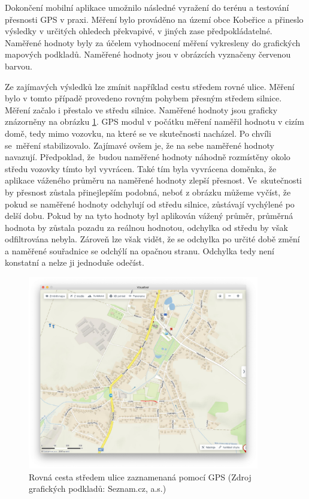 \documentclass[czech, bachelor]{diploma}
\begin{document}
Dokončení mobilní aplikace umožnilo následné vyražení do terénu a testování přesnosti GPS v praxi. Měření bylo prováděno na území
obce Kobeřice a přineslo výsledky v určitých ohledech překvapivé, v jiných zase předpokládatelné. Naměřené hodnoty byly za účelem
vyhodnocení měření vykresleny do grafických mapových podkladů. Naměřené hodnoty jsou v obrázcích vyznačeny červenou barvou.

Ze zajímavých výsledků lze zmínit například cestu středem rovné ulice. Měření bylo v tomto případě provedeno rovným pohybem
přesným středem silnice. Měření začalo i přestalo ve středu silnice. Naměřené hodnoty jsou graficky znázorněny na obrázku
\ref{fig:louky}. GPS modul v počátku měření naměřil hodnotu v cizím domě, tedy mimo vozovku, na které se ve skutečnosti nacházel.
Po chvíli se~měření stabilizovalo. Zajímavé ovšem je, že na sebe naměřené hodnoty navazují. Předpoklad, že~budou naměřené hodnoty
náhodně rozmístěny okolo středu vozovky tímto byl vyvrácen. Také tím byla vyvrácena doměnka, že aplikace váženého průměru
na naměřené hodnoty zlepší přesnost. Ve~skutečnosti by přesnost zůstala přinejlepším podobná, neboť z obrázku můžeme vyčíst, že
pokud se naměřené hodnoty odchylují od středu silnice, zůstávají vychýlené po delší dobu. Pokud by na tyto hodnoty byl aplikován
vážený průměr, průměrná hodnota by zůstala pozadu za reálnou hodnotou, odchylka od středu by však odfiltrována nebyla.
Zároveň lze však vidět, že se odchylka po určité době změní a naměřené souřadnice se odchýlí na opačnou stranu. Odchylka tedy není
konstatní a nelze ji jednoduše odečíst.

\begin{figure}
    \centering
    \includegraphics[width=0.9\textwidth]{Figures/louky.png}
    \caption{Rovná cesta středem ulice zaznamenaná pomocí GPS (Zdroj grafických podkladů: Seznam.cz, a.s.)}
    \label{fig:louky}
\end{figure}
\end{document}
